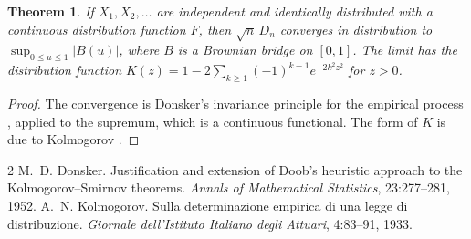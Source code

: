 \documentclass[11pt]{article}
\newtheorem{theorem}{Theorem}[section]
\theoremstyle{definition}
\begin{document}
\begin{theorem}\label{thm:ks}
If $X_1, X_2, \dots$ are independent and identically distributed with a continuous distribution function $F$, then
$\sqrt{n}\, D_n$ converges in distribution to $\sup_{0 \le u \le 1} \lvert B(u) \rvert$, where $B$ is a Brownian
bridge on $[0, 1]$. The limit has the distribution function
$K(z) = 1 - 2 \sum_{k \ge 1} (-1)^{k-1} e^{-2 k^2 z^2}$ for $z > 0$.
\end{theorem}

\begin{proof}
The convergence is Donsker's invariance principle for the empirical process \cite{donsker}, applied to the
supremum, which is a continuous functional. The form of $K$ is due to Kolmogorov \cite{kolmogorov}.
\end{proof}

\begin{thebibliography}{2}
M.~D. Donsker.
\newblock Justification and extension of Doob's heuristic approach to the Kolmogorov--Smirnov theorems.
\newblock \emph{Annals of Mathematical Statistics}, 23:277--281, 1952.
A.~N. Kolmogorov.
\newblock Sulla determinazione empirica di una legge di distribuzione.
\newblock \emph{Giornale dell'Istituto Italiano degli Attuari}, 4:83--91, 1933.
\end{thebibliography}
\end{document}
